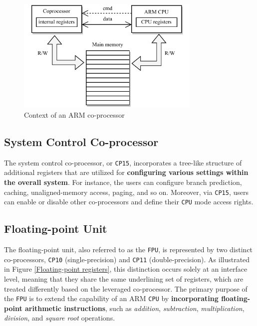 \documentclass[english, ing, kiv, he, iso690numb, pdf]{fasthesis}
\begin{document}
	\begin{figure}[ht]
		\centering
		\includegraphics[width=0.78\textwidth]{img/diagrams/coprocessors_3.pdf}
		\caption{Context of an ARM co-processor}
		\label{Context of an ARM co-processor}
	\end{figure}
	
	\subsection{System Control Co-processor}
	
	The system control co-processor, or \texttt{CP15}, incorporates a tree-like structure of additional registers that are utilized for \textbf{configuring various settings within the overall system}. For instance, the users can configure branch prediction, caching, unaligned-memory access, paging, and so on. Moreover, via \texttt{CP15}, users can enable or disable other co-processors and define their \texttt{CPU} mode access rights.
	
	\subsection{Floating-point Unit}
	
	The floating-point unit, also referred to as the \texttt{FPU}, is represented by two distinct co-processors, \texttt{CP10} (single-precision) and \texttt{CP11} (double-precision). As illustrated in Figure \ref{Floating-point registers}, this distinction occurs solely  at an interface level, meaning that they share the same underlining set of registers, which are treated differently based on the leveraged co-processor. The primary purpose of the \texttt{FPU} is to extend the capability of an ARM \texttt{CPU} by \textbf{incorporating floating-point arithmetic instructions}, such as \textit{addition}, \textit{subtraction}, \textit{multiplication}, \textit{division}, and \textit{square root} operations.
	
\end{document}
